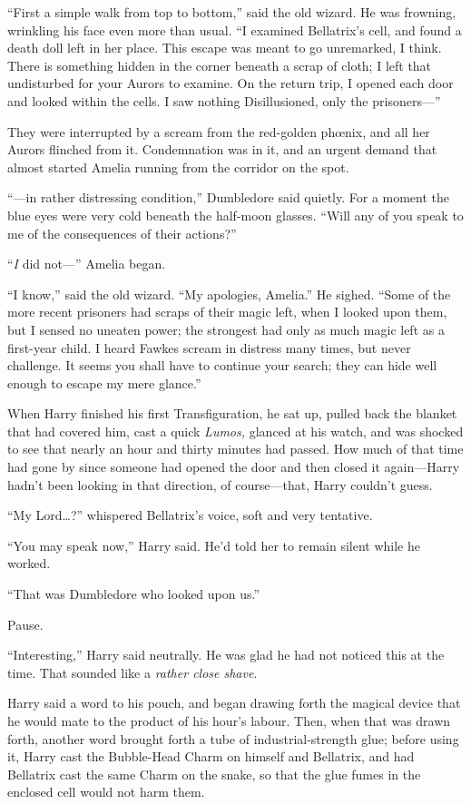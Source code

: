 “First a simple walk from top to bottom,” said the old wizard. He was frowning, wrinkling his face even more than usual.
“I examined Bellatrix’s cell, and found a death doll left in her place. This escape was meant to go unremarked, I think. There is something hidden in the corner beneath a scrap of cloth; I left that undisturbed for your Aurors to examine. On the return trip, I opened each door and looked within the cells. I saw nothing Disillusioned, only the prisoners—”

They were interrupted by a scream from the red-golden phœnix, and all her Aurors flinched from it. Condemnation was in it, and an urgent demand that almost started Amelia running from the corridor on the spot.

“—in rather distressing condition,” Dumbledore said quietly. For a moment the blue eyes were very cold beneath the half-moon glasses.
“Will any of you speak to me of the consequences of their actions?”

“\emph{I} did not—” Amelia began.

“I know,” said the old wizard.
“My apologies, Amelia.” He sighed.
“Some of the more recent prisoners had scraps of their magic left, when I looked upon them, but I sensed no uneaten power; the strongest had only as much magic left as a first-year child. I heard Fawkes scream in distress many times, but never challenge. It seems you shall have to continue your search; they can hide well enough to escape my mere glance.”

\later

When Harry finished his first Transfiguration, he sat up, pulled back the blanket that had covered him, cast a quick \emph{Lumos,} glanced at his watch, and was shocked to see that nearly an hour and thirty minutes had passed. How much of that time had gone by since someone had opened the door and then closed it again—Harry hadn’t been looking in that direction, of course—that, Harry couldn’t guess.

“My Lord…?” whispered Bellatrix’s voice, soft and very tentative.

“You may speak now,” Harry said. He’d told her to remain silent while he worked.

“That was Dumbledore who looked upon us.”

Pause.

“Interesting,” Harry said neutrally. He was glad he had not noticed this at the time. That sounded like a \emph{rather close shave}.

Harry said a word to his pouch, and began drawing forth the magical device that he would mate to the product of his hour’s labour. Then, when that was drawn forth, another word brought forth a tube of industrial-strength glue; before using it, Harry cast the Bubble-Head Charm on himself and Bellatrix, and had Bellatrix cast the same Charm on the snake, so that the glue fumes in the enclosed cell would not harm them.

